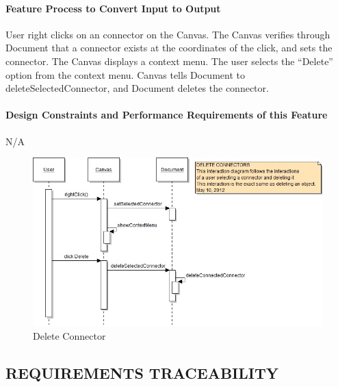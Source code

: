 \documentclass[twoside,letterpaper]{article}
\begin{document}
{\paragraph{Feature Process to Convert Input to Output}
{
User right clicks on an connector on the Canvas. The Canvas verifies through Document that a connector exists at the coordinates of the click, and sets the connector.  The Canvas displays a context menu.  The user selects the ``Delete'' option from the context menu.  Canvas tells Document to deleteSelectedConnector, and Document deletes the connector.
}

\paragraph{Design Constraints and Performance Requirements of this Feature}
{
N/A
}
\bigskip
\bigskip

\begin{figure}[h]
\centering
\includegraphics[width=6.0in]{IntDelConn.jpg}
\caption{Delete Connector}
\end{figure}

\clearpage

  






\clearpage

\begin{landscape}

\section[REQUIREMENTS TRACEABILITY]
  {\bfseries REQUIREMENTS TRACEABILITY}
{\itshape }


\end{landscape}}
\end{document}
